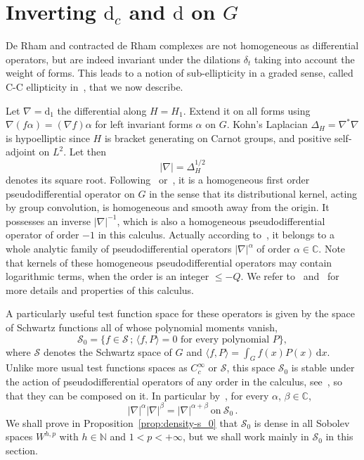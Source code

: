 \documentclass[11pt]{article}
\theoremstyle{definition}
\numberwithin{equation}{section}
\numberwithin{figure}{section}
\numberwithin{table}{section}
\newcommand{\N}{\mathbb{N}}
\newcommand*\calS{\mathcal{S}}
\newcommand{\dd}{\mathrm{d}}
\newcommand{\dx}{\dd x}
\begin{document}
\section{Inverting \texorpdfstring{$\dd_c$}{dc} and \texorpdfstring{$\dd$}{d} on \texorpdfstring{$G$}{G}}\label{sec:inverting-d-d_c}

De Rham and contracted de Rham complexes are not homogeneous as differential operators, but are indeed invariant under the dilations $\delta_t$ taking into account the weight of forms. This leads to a notion of sub-ellipticity in a graded sense, called C-C ellipticity in~\cite{Rumin_CRAS_1999, Rumin_TSG}, that we now describe.

Let $\nabla = \dd_1$ the differential along $H = H_1$. Extend it on all forms using $\nabla (f \alpha) = (\nabla f) \alpha$ for left invariant forms $\alpha$ on $G$. Kohn's Laplacian $\Delta_H = \nabla^* \nabla$ is hypoelliptic since $H$ is bracket generating on Carnot groups, and positive self-adjoint on $L^2$. Let then
\[
|\nabla| = \Delta_H^{1/2}
\]
denotes its square root. Following~\cite[Section~3]{Folland_1975} or~\cite{CGGP}, it is a homogeneous first order pseudodifferential operator on $G$ in the sense that its distributional kernel, acting by group convolution, is homogeneous and smooth away from the origin. It possesses an inverse $|\nabla|^{-1}$, which is also a homogeneous pseudodifferential operator of order $-1$ in this calculus. Actually according to~\cite[Theorem~3.15]{Folland_1975}, it belongs to a whole analytic family of pseudodifferential operators $|\nabla|^\alpha$ of order $\alpha \in \mathbb{C}$. Note that kernels of these homogeneous pseudodifferential operators may contain logarithmic terms, when the order is an integer $\leq -Q$. We refer to~\cite{CGGP} and~\cite[Section~1]{Folland_1975} for more details and properties of this calculus.

A particularly useful test function space for these operators is given by the space of Schwartz functions all of whose polynomial moments vanish,
\begin{equation}\label{eq:9}
\calS_0=\{f\in\calS\,;\,\langle f,P\rangle=0 \text{ for every polynomial }P\},
\end{equation}
where $\mathcal{S}$ denotes the Schwartz space of $G$ and $\langle f,P\rangle=\int_Gf(x)P(x)\,\dx$. Unlike more usual test functions spaces as $C^\infty_c$ or $\mathcal{S}$, this space $\calS_0$ is stable under the action of pseudodifferential operators of any order in the calculus, see~\cite[Proposition~2.2]{CGGP}, so that they can be composed on it. In particular by~\cite[Theorem~3.15]{Folland_1975}, for every $\alpha$, $\beta \in \mathbb{C}$,
\begin{equation}\label{eq:10}
|\nabla|^\alpha |\nabla|^{\beta} = |\nabla|^{\alpha+\beta} \
\mathrm{on} \ \calS_0 \,.
\end{equation}
We shall prove in Proposition~\ref{prop:density-s_0} that $\calS_0$ is dense in all Sobolev spaces $W^{h,p}$ with $h \in \N$ and $1< p< +\infty$, but we shall work mainly in $\calS_0$ in this section.
\end{document}
